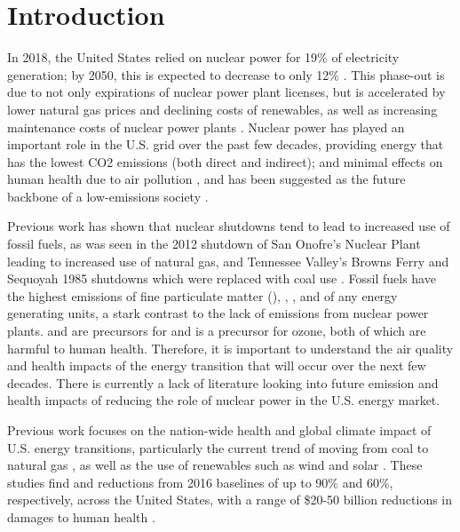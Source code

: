 \documentclass[12]{article}
\begin{document}
\section{Introduction}
In 2018, the United States relied on nuclear power for 19\% of electricity generation; by 2050, this is expected to decrease to only 12\% \citep{eia_annual_2020}. This phase-out is due to not only expirations of nuclear power plant licenses, but is accelerated by lower natural gas prices and declining costs of renewables, as well as increasing maintenance costs of nuclear power plants \citep{davis_market_2016}. Nuclear power has played an important role in the U.S. grid over the past few decades, providing energy that has the lowest CO2 emissions (both direct and indirect); and minimal effects on human health due to air pollution \citep{markandya_electricity_2007}, and has been suggested as the future backbone of a low-emissions society \citep{iea_nuclear_2019}. 

Previous work has shown that nuclear shutdowns tend to lead to increased use of fossil fuels, as was seen in the 2012 shutdown of San Onofre’s Nuclear Plant leading to increased use of natural gas, and Tennessee Valley’s Browns Ferry and Sequoyah 1985 shutdowns which were replaced with coal use \citep{davis_market_2016,severnini_impacts_2017}. Fossil fuels have the highest emissions of fine particulate matter (), , , and  of any energy generating units, a stark contrast to the lack of emissions from nuclear power plants.  and  are precursors for  and  is a precursor for ozone, both of which are harmful to human health. Therefore, it is important to understand the air quality and health impacts of the energy transition that will occur over the next few decades. There is currently a lack of literature looking into future emission and health impacts of reducing the role of nuclear power in the U.S. energy market. 

Previous work focuses on the nation-wide health and global climate impact of U.S. energy transitions, particularly the current trend of moving from coal to natural gas \citep{lueken_climate_2016, zhang_climate_2016}, as well as the use of renewables such as wind and solar \citep{millstein_climate_2017}. These studies find  and  reductions from 2016 baselines of up to 90\% and 60\%, respectively, across the United States, with a range of \$20-50 billion reductions in damages to human health \citep{lueken_climate_2016}. 
\end{document}
